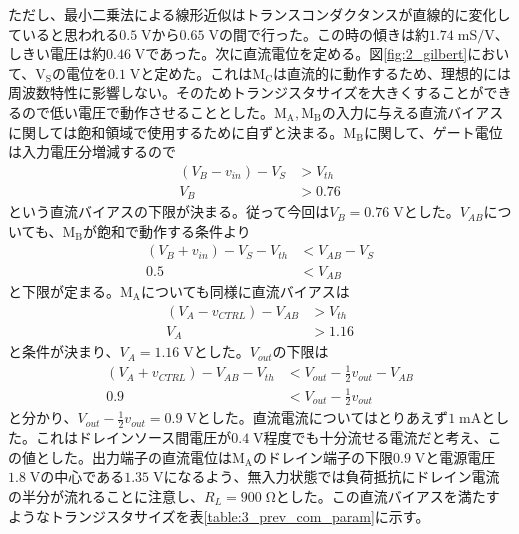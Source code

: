             ただし、最小二乗法による線形近似はトランスコンダクタンスが直線的に変化していると思われる$0.5\;\mathrm{V}$から$0.65\;\mathrm{V}$の間で行った。この時の傾きは約$1.74\;\mathrm{mS/V}$、しきい電圧は約$0.46\;\mathrm{V}$であった。次に直流電位を定める。図\ref{fig:2_gilbert}において、$\mathrm{V_{S}}$の電位を$0.1\;\mathrm{V}$と定めた。これは$\mathrm{M_{C}}$は直流的に動作するため、理想的には周波数特性に影響しない。そのためトランジスタサイズを大きくすることができるので低い電圧で動作させることとした。$\mathrm{M_{A},M_{B}}$の入力に与える直流バイアスに関しては飽和領域で使用するために自ずと決まる。$\mathrm{M_{B}}$に関して、ゲート電位は入力電圧分増減するので
            \begin{align*}
                \left( V_{B}-v_{in} \right) -V_{S} &> V_{th}  \\
                V_{B} &> 0.76
            \end{align*}
            という直流バイアスの下限が決まる。従って今回は$V_{B}=0.76\;\mathrm{V}$とした。$V_{AB}$についても、$\mathrm{M_{B}}$が飽和で動作する条件より
            \begin{align*}
                \left( V_{B}+v_{in} \right) - V_{S} -V_{th} &< V_{AB} - V_{S}   \\
                0.5 &< V_{AB}  
            \end{align*}
            と下限が定まる。$\mathrm{M_{A}}$についても同様に直流バイアスは
            \begin{align*}
                \left( V_{A}-v_{CTRL} \right) -V_{AB} &> V_{th}  \\
                V_{A} &> 1.16
            \end{align*}
            と条件が決まり、$V_{A}=1.16\;\mathrm{V}$とした。$V_{out}$の下限は
            \begin{align*}
                \left( V_{A}+v_{CTRL} \right) - V_{AB} -V_{th} &< V_{out} - \frac{1}{2}v_{out} - V_{AB}   \\
                0.9 &< V_{out} - \frac{1}{2}v_{out}
            \end{align*}
            と分かり、$V_{out}-\frac{1}{2}v_{out}=0.9\;\mathrm{V}$とした。直流電流についてはとりあえず$1\;\mathrm{mA}$とした。これはドレインソース間電圧が$0.4\;\mathrm{V}$程度でも十分流せる電流だと考え、この値とした。出力端子の直流電位は$\mathrm{M_{A}}$のドレイン端子の下限$0.9\;\mathrm{V}$と電源電圧$1.8\;\mathrm{V}$の中心である$1.35\;\mathrm{V}$になるよう、無入力状態では負荷抵抗にドレイン電流の半分が流れることに注意し、$R_{L}=900\;\mathrm{\Omega}$とした。この直流バイアスを満たすようなトランジスタサイズを表\ref{table:3_prev_com_param}に示す。\par
